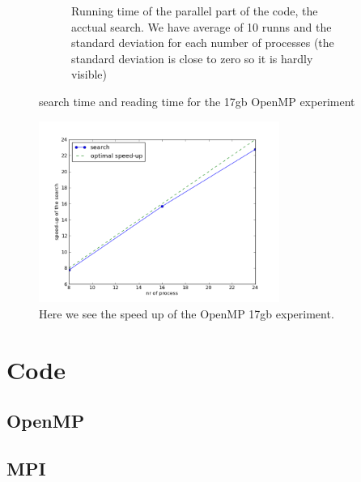 \documentclass[a4paper,10pt]{article}
\begin{document}
\begin{figure}[h!t]
\begin{subfigure}[b]{0.70\textwidth}
                \caption{Running time of the parallel part of the code, the acctual search. 
                         We have average of 10 runns and the standard deviation for each number
                         of processes (the standard deviation is close to zero so it is hardly 
                         visible)}
                \label{fig:mpio_search}
        \end{subfigure}
        \caption{search time and reading time for the 17gb OpenMP experiment}
\end{figure}

\begin{figure}[htb]
  \centering
  \includegraphics[width=0.7\textwidth]{graphics/mpio17gb/search_speedup.png}
  \caption{Here we see the speed up of the OpenMP 17gb experiment.}
  \label{fig:mpio_speedup}
\end{figure}
\clearpage
\appendix
\section{Code}
%    
  \subsection{OpenMP}
       
  \subsection{MPI}
     
\end{document}
